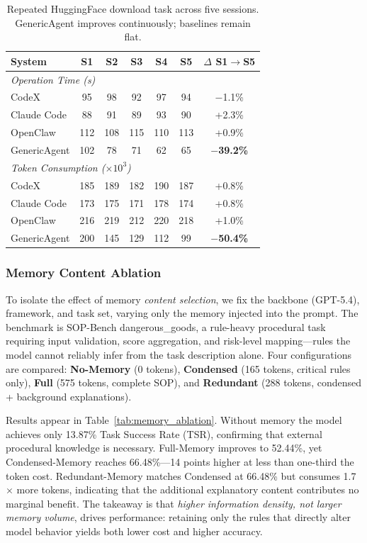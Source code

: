 \begin{table}[t]
\centering
\caption{Repeated HuggingFace download task across five sessions. GenericAgent improves continuously; baselines remain flat.}
\label{tab:memory_improvement}
\begin{tabular}{lcccccc}
\toprule
\textbf{System} & \textbf{S1} & \textbf{S2} & \textbf{S3} & \textbf{S4} & \textbf{S5} & \textbf{$\Delta$ S1$\to$S5} \\
\midrule
\multicolumn{7}{l}{\emph{Operation Time (s)}} \\
\midrule
CodeX        & 95  & 98  & 92  & 97  & 94  & $-$1.1\% \\
Claude Code  & 88  & 91  & 89  & 93  & 90  & +2.3\% \\
OpenClaw     & 112 & 108 & 115 & 110 & 113 & +0.9\% \\
GenericAgent & 102 & 78  & 71  & 62  & 65  & \textbf{$-$39.2\%} \\
\midrule
\multicolumn{7}{l}{\emph{Token Consumption ($\times 10^3$)}} \\
\midrule
CodeX        & 185 & 189 & 182 & 190 & 187 & +0.8\% \\
Claude Code  & 173 & 175 & 171 & 178 & 174 & +0.8\% \\
OpenClaw     & 216 & 219 & 212 & 220 & 218 & +1.0\% \\
GenericAgent & 200 & 145 & 129 & 112 & 99  & \textbf{$-$50.4\%} \\
\bottomrule
\end{tabular}
\end{table}


\subsubsection{Memory Content Ablation}
\label{sec:exp_mem_ablation}

To isolate the effect of memory \emph{content selection}, we fix the backbone (GPT-5.4), framework, and task set, varying only the memory injected into the prompt.
The benchmark is SOP-Bench dangerous\_goods, a rule-heavy procedural task requiring input validation, score aggregation, and risk-level mapping---rules the model cannot reliably infer from the task description alone.
Four configurations are compared:
\textbf{No-Memory} (0 tokens),
\textbf{Condensed} (165 tokens, critical rules only),
\textbf{Full} (575 tokens, complete SOP),
and \textbf{Redundant} (288 tokens, condensed + background explanations).

Results appear in Table~\ref{tab:memory_ablation}.
Without memory the model achieves only 13.87\% Task Success Rate (TSR), confirming that external procedural knowledge is necessary.
Full-Memory improves to 52.44\%, yet Condensed-Memory reaches 66.48\%---14 points higher at less than one-third the token cost.
Redundant-Memory matches Condensed at 66.48\% but consumes 1.7$\times$ more tokens, indicating that the additional explanatory content contributes no marginal benefit.
The takeaway is that \emph{higher information density, not larger memory volume}, drives performance: retaining only the rules that directly alter model behavior yields both lower cost and higher accuracy.

